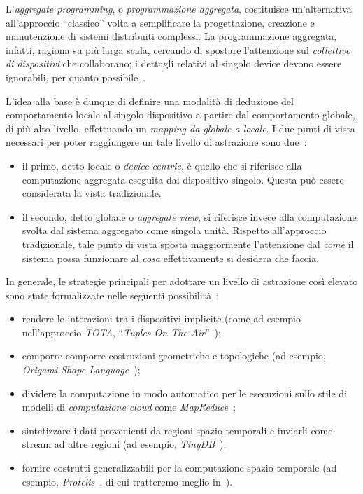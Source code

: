 L'\emph{aggregate programming}, o \emph{programmazione aggregata}, costituisce un'alternativa all'approccio ``classico''
volta a semplificare la progettazione, creazione e manutenzione di sistemi distribuiti complessi.
La programmazione aggregata, infatti, ragiona su più larga scala, cercando di spostare l'attenzione sul \emph{collettivo di dispositivi} che collaborano;
i dettagli relativi al singolo device devono essere ignorabili, per quanto possibile~\cite{7274429}.

L'idea alla base è dunque di definire una modalità di deduzione del comportamento locale al singolo dispositivo a partire dal comportamento globale, di più alto livello,
effettuando un \emph{mapping da globale a locale}.
I due punti di vista necessari per poter raggiungere un tale livello di astrazione sono due~\cite{aggregatescala-pmldc2016}:

\begin{itemize}
    \item
        il primo, detto locale o \emph{device-centric}, è quello che si riferisce alla computazione aggregata eseguita dal dispositivo singolo.
        Questa può essere considerata la vista tradizionale.
    \item
        il secondo, detto globale o \emph{aggregate view}, si riferisce invece alla computazione svolta dal sistema aggregato come singola unità.
        Rispetto all'approccio tradizionale, tale punto di vista sposta maggiormente l'attenzione dal \emph{come} il sistema possa funzionare
        al \emph{cosa} effettivamente si desidera che faccia.
\end{itemize}

In generale, le strategie principali per adottare un livello di astrazione così elevato sono state formalizzate nelle seguenti possibilità~\cite{7274429}:

\begin{itemize}
  \item rendere le interazioni tra i dispositivi implicite (come ad esempio nell'approccio \emph{TOTA}, ``\emph{Tuples On The Air}''~\cite{10.1145/1538942.1538945});
  \item comporre comporre costruzioni geometriche e topologiche (ad esempio, \emph{Origami Shape Language}~\cite{nagpal2001programmable});
  \item dividere la computazione in modo automatico per le esecuzioni sullo stile di modelli di \emph{computazione cloud} come \emph{MapReduce}~\cite{10.1145/1327452.1327492};
  \item sintetizzare i dati provenienti da regioni spazio-temporali e inviarli come stream ad altre regioni (ad esempio, \emph{TinyDB}~\cite{1017485});
  \item fornire costrutti generalizzabili per la computazione spazio-temporale (ad esempio, \emph{Protelis}~\cite{PianiniSASOTutorial2017}, di cui tratteremo meglio in~).
\end{itemize}

